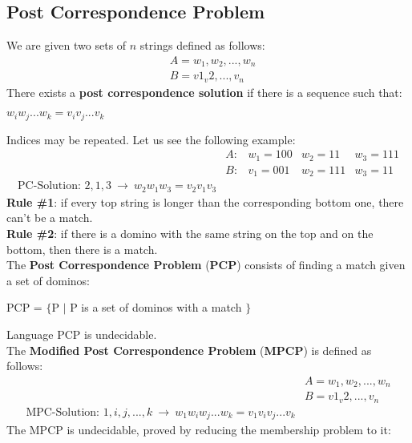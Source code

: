 \documentclass{article}
\begin{document}
\subsection{Post Correspondence Problem}
We are given two sets of $n$ strings defined as follows:
\begin{align*}
    &A=w_1,w_2,...,w_n \\
    &B=v1_v2,...,v_n
\end{align*}
There exists a \textbf{post correspondence solution} if there is a sequence such that:
\begin{center}
    $w_iw_j...w_k=v_iv_j...v_k$
\end{center}
Indices may be repeated. Let us see the following example:
\begin{align*}
    &A: &w_1 = 100 &w_2 = 11 &w_3 = 111 \\ 
    &B: &v_1 = 001 &w_2 = 111 &w_3 = 11 \\ 
    \text{PC-Solution: } 2,1,3 \ \rightarrow \ w_2w_1w_3 = v_2v_1v_3
\end{align*}
\textbf{Rule \#1}: if every top string is longer than the corresponding bottom one, there can’t be a match.
\vspace{0.2cm} \\
\textbf{Rule \#2}: if there is a domino with the same string on the top and on the bottom, then there is a match.
\vspace{0.2cm} \\
The \textbf{Post Correspondence Problem} (\textbf{PCP}) consists of finding a match given a set of dominos:
\begin{center}
    PCP = $\{$P $|$ P is a set of dominos with a match $\}$
\end{center}
Language PCP is undecidable. \\
The \textbf{Modified Post Correspondence Problem} (\textbf{MPCP}) is defined as follows:
\begin{align*}
    &A=w_1,w_2,...,w_n \\
    &B=v1_v2,...,v_n \\
    \text{MPC-Solution: } 1,i,j, ...,k \ \rightarrow \ w_1w_iw_j...w_k = v_1v_iv_j...v_k
\end{align*}
The MPCP is undecidable, proved by reducing the membership problem to it:
\end{document}
